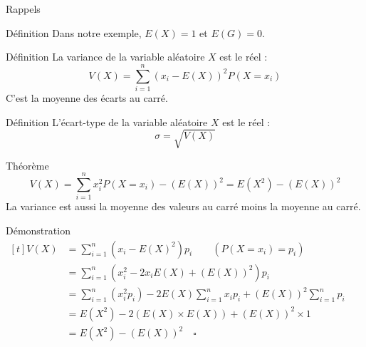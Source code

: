 \documentclass{coursbook}
\begin{document}
\begin{Gpartie}{Rappels}
\begin{Spartie}{Définition}
            Dans notre exemple, $E(X)=1$ et $E(G)=0$.
        \end{Spartie}
        \begin{Spartie}{Définition} 
            La variance de la variable aléatoire $X$ est le réel : \[V(X)=\sum_{i=1}^n\left(x_i-E(X)\right)^2P(X=x_i)\]
            C'est la moyenne des écarts au carré.
        \end{Spartie}
        \begin{Spartie}{Définition} 
            L'écart-type de la variable aléatoire $X$ est le réel : \[\sigma=\sqrt{V(X)}\]
        \end{Spartie}
        \begin{Spartie}{Théorème} 
            \[V(X)=\sum_{i=1}^nx_i^2P(X=x_i)-\left(E(X)\right)^2=E\left(X^2\right)-\left(E(X)\right)^2\]
            La variance est aussi la moyenne des valeurs au carré moins la moyenne au carré.
            \begin{SSpartie}{Démonstration} 
                $\begin{aligned}[t]
                    V(X)&=\sum_{i=1}^n\left(x_i-E(X)^2\right)p_i\qquad\left(P(X=x_i)=p_i\right) \\
                    &=\sum_{i=1}^n\left(x_i^2-2x_iE(X)+\left(E(X)\right)^2\right)p_i \\
                    &=\sum_{i=1}^n\left(x_i^2p_i\right)-2E(X)\sum_{i=1}^n x_i p_i+\left(E(X)\right)^2\sum_{i=1}^np_i \\
                    &=E\left(X^2\right)-2\left(E(X)\times E(X)\right)+\left(E(X)\right)^2\times 1 \\
                    &=E\left(X^2\right)-\left(E(X)\right)^2\quad\square
                \end{aligned}$
            \end{SSpartie}
        \end{Spartie}
    \end{Gpartie}
\end{document}
